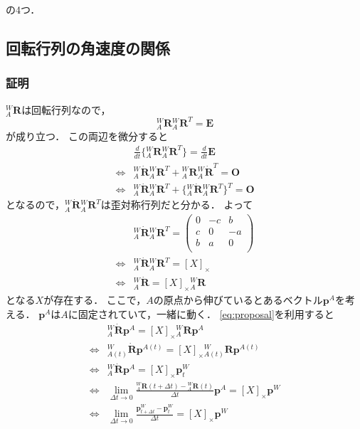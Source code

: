 の4つ．

\subsection{回転行列の角速度の関係}\label{subsec:gyro}

\subsubsection{証明}
${}^{W}_{A}\boldsymbol{R}$は回転行列なので，
\begin{equation}
  {}^{W}_{A}\boldsymbol{R} {}^{W}_{A}\boldsymbol{R}^{T} = \boldsymbol{E}
\end{equation}
が成り立つ．
この両辺を微分すると
\begin{align}
  & \frac{d}{dt}\{{}^{W}_{A}\boldsymbol{R} {}^{W}_{A}\boldsymbol{R}^{T}\} = \frac{d}{dt}\boldsymbol{E}\\
  \Leftrightarrow & {}^{W}_{A}\dot{\boldsymbol{R}} {}^{W}_{A}\boldsymbol{R}^{T} + {}^{W}_{A}\boldsymbol{R} {}^{W}_{A}\dot{\boldsymbol{R}}^{T} = \boldsymbol{O}\\
  \Leftrightarrow & {}^{W}_{A}\dot{\boldsymbol{R}} {}^{W}_{A}\boldsymbol{R}^{T} + \{{}^{W}_{A}\dot{\boldsymbol{R}} {}^{W}_{A}\boldsymbol{R}^{T}\}^{T} = \boldsymbol{O}
\end{align}
となるので，${}^{W}_{A}\dot{\boldsymbol{R}} {}^{W}_{A}\boldsymbol{R}^{T}$は歪対称行列だと分かる．
よって
\begin{align}
  & {}^{W}_{A}\dot{\boldsymbol{R}} {}^{W}_{A}\boldsymbol{R}^{T} =
  \begin{pmatrix}
    0 & -c & b\\
    c &  0 & -a\\
    b &  a & 0\\
  \end{pmatrix}\\
  \Leftrightarrow & {}^{W}_{A}\dot{\boldsymbol{R}} {}^{W}_{A}\boldsymbol{R}^{T} = [X]_{\times}\\
  \Leftrightarrow & {}^{W}_{A}\dot{\boldsymbol{R}} = [X]_{\times} {}^{W}_{A}\boldsymbol{R} \label{eq:proposal}
\end{align}
となる$X$が存在する．
ここで，$A$の原点から伸びているとあるベクトル$\boldsymbol{p}^{A}$を考える．
$\boldsymbol{p}^{A}$は$A$に固定されていて，一緒に動く．
\autoref{eq:proposal}を利用すると
\begin{align}
  & {}^{W}_{A}\dot{\boldsymbol{R}} \boldsymbol{p}^{A} = [X]_{\times} {}^{W}_{A}\boldsymbol{R} \boldsymbol{p}^{A}\\
  \Leftrightarrow & {}^{W}_{A(t)}\dot{\boldsymbol{R}} \boldsymbol{p}^{A(t)} = [X]_{\times} {}^{W}_{A(t)}\boldsymbol{R} \boldsymbol{p}^{A(t)}\\
  \Leftrightarrow & {}^{W}_{A}\dot{\boldsymbol{R}} \boldsymbol{p}^{A} = [X]_{\times} \boldsymbol{p}^{W}_{t}\\
  \Leftrightarrow & \lim_{\Delta t \to 0} \frac{{}^{W}_{A}\boldsymbol{R}(t+ \Delta t) - {}^{W}_{A}\boldsymbol{R}(t)}{\Delta t} \boldsymbol{p}^{A} = [X]_{\times} \boldsymbol{p}^{W}\\
  \Leftrightarrow & \lim_{\Delta t \to 0} \frac{\boldsymbol{p}^{W}_{t+ \Delta t} - \boldsymbol{p}^{W}_{t}}{\Delta t} = [X]_{\times} \boldsymbol{p}^{W} \label{eq:bibun}
\end{align}
